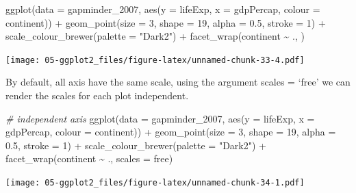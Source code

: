 \documentclass[
]{book}
\newenvironment{Shaded}{\begin{snugshade}}{\end{snugshade}}
\newcommand{\AttributeTok}[1]{\textcolor[rgb]{0.77,0.63,0.00}{#1}}
\newcommand{\CommentTok}[1]{\textcolor[rgb]{0.56,0.35,0.01}{\textit{#1}}}
\newcommand{\DecValTok}[1]{\textcolor[rgb]{0.00,0.00,0.81}{#1}}
\newcommand{\FloatTok}[1]{\textcolor[rgb]{0.00,0.00,0.81}{#1}}
\newcommand{\FunctionTok}[1]{\textcolor[rgb]{0.00,0.00,0.00}{#1}}
\newcommand{\NormalTok}[1]{#1}
\newcommand{\SpecialCharTok}[1]{\textcolor[rgb]{0.00,0.00,0.00}{#1}}
\newcommand{\StringTok}[1]{\textcolor[rgb]{0.31,0.60,0.02}{#1}}
\begin{document}
\begin{Shaded}
\begin{Highlighting}[]


\FunctionTok{ggplot}\NormalTok{(}\AttributeTok{data =}\NormalTok{ gapminder\_2007, }\FunctionTok{aes}\NormalTok{(}\AttributeTok{y =}\NormalTok{ lifeExp, }\AttributeTok{x =}\NormalTok{ gdpPercap, }\AttributeTok{colour =}\NormalTok{ continent)) }\SpecialCharTok{+} 
  \FunctionTok{geom\_point}\NormalTok{(}\AttributeTok{size =} \DecValTok{3}\NormalTok{, }\AttributeTok{shape =} \DecValTok{19}\NormalTok{, }\AttributeTok{alpha =} \FloatTok{0.5}\NormalTok{, }\AttributeTok{stroke =} \DecValTok{1}\NormalTok{) }\SpecialCharTok{+}
  \FunctionTok{scale\_colour\_brewer}\NormalTok{(}\AttributeTok{palette =} \StringTok{"Dark2"}\NormalTok{) }\SpecialCharTok{+}
  \FunctionTok{facet\_wrap}\NormalTok{(continent }\SpecialCharTok{\textasciitilde{}}\NormalTok{ ., )}
\end{Highlighting}
\end{Shaded}

\texttt{[image: 05-ggplot2\_files/figure-latex/unnamed-chunk-33-4.pdf]}

By default, all axis have the same scale, using the argument scales = `free' we can render the scales for each plot independent.

\begin{Shaded}
\begin{Highlighting}[]
\CommentTok{\# independent axis}
\FunctionTok{ggplot}\NormalTok{(}\AttributeTok{data =}\NormalTok{ gapminder\_2007, }\FunctionTok{aes}\NormalTok{(}\AttributeTok{y =}\NormalTok{ lifeExp, }\AttributeTok{x =}\NormalTok{ gdpPercap, }\AttributeTok{colour =}\NormalTok{ continent)) }\SpecialCharTok{+} 
  \FunctionTok{geom\_point}\NormalTok{(}\AttributeTok{size =} \DecValTok{3}\NormalTok{, }\AttributeTok{shape =} \DecValTok{19}\NormalTok{, }\AttributeTok{alpha =} \FloatTok{0.5}\NormalTok{, }\AttributeTok{stroke =} \DecValTok{1}\NormalTok{) }\SpecialCharTok{+}
  \FunctionTok{scale\_colour\_brewer}\NormalTok{(}\AttributeTok{palette =} \StringTok{"Dark2"}\NormalTok{) }\SpecialCharTok{+}
  \FunctionTok{facet\_wrap}\NormalTok{(continent }\SpecialCharTok{\textasciitilde{}}\NormalTok{ ., }\AttributeTok{scales =} \StringTok{\textquotesingle{}free\textquotesingle{}}\NormalTok{)}
\end{Highlighting}
\end{Shaded}

\texttt{[image: 05-ggplot2\_files/figure-latex/unnamed-chunk-34-1.pdf]}
\end{document}
